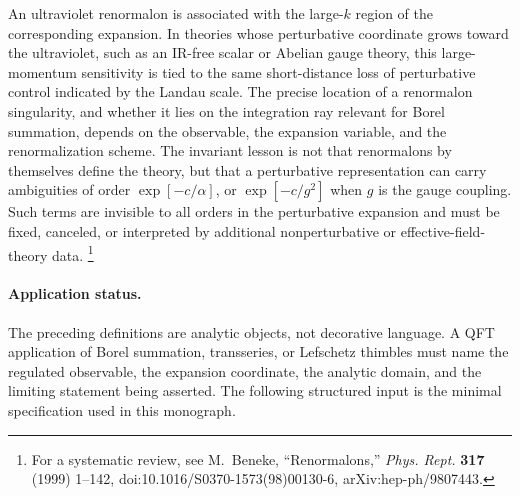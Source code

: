 An ultraviolet renormalon is associated with the large-\(k\) region of the
corresponding expansion.  In theories whose perturbative coordinate grows
toward the ultraviolet, such as an IR-free scalar or Abelian gauge theory, this
large-momentum sensitivity is tied to the same short-distance loss of
perturbative control indicated by the Landau scale.  The precise location of a
renormalon singularity, and whether it lies on the integration ray relevant for
Borel summation, depends on the observable, the expansion variable, and the
renormalization scheme.  The invariant lesson is not that renormalons by
themselves define the theory, but that a perturbative representation can carry
ambiguities of order \(\exp[-c/\alpha]\), or \(\exp[-c/g^2]\) when \(g\) is the
gauge coupling.  Such terms are invisible to all orders in the perturbative
expansion and must be fixed, canceled, or interpreted by additional
nonperturbative or effective-field-theory data.
\footnote{For a systematic review, see M.~Beneke, ``Renormalons,''
\emph{Phys. Rept.} \textbf{317} (1999) 1--142,
doi:10.1016/S0370-1573(98)00130-6, arXiv:hep-ph/9807443.}

\paragraph{Application status.}
The preceding definitions are analytic objects, not decorative language.  A
QFT application of Borel summation, transseries, or Lefschetz thimbles must
name the regulated observable, the expansion coordinate, the analytic domain,
and the limiting statement being asserted.  The following structured input is
the minimal specification used in this monograph.

